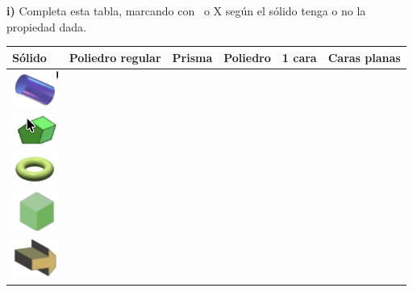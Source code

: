 \documentclass[12pt,a4paper]{article}
\begin{document}
\begin{tcolorbox}[enhanced, breakable,
	colback=fondoverde, colframe=verdeclaro, title=\textbf{PRACTICA}]
	\textbf{i)} Completa esta tabla, marcando con \checkmark\ o X según el sólido tenga o no la propiedad dada.
	
	{\centering
		\small
		\renewcommand{\arraystretch}{1.4}
		\begin{tabular}{|>{\centering\arraybackslash}m{3cm}|
				>{\centering\arraybackslash}m{2cm}|
				>{\centering\arraybackslash}m{2cm}|
				>{\centering\arraybackslash}m{2cm}|
				>{\centering\arraybackslash}m{2cm}|
				>{\centering\arraybackslash}m{2cm}|}
			\hline
			\textbf{Sólido} & \textbf{Poliedro regular} & \textbf{Prisma} & \textbf{Poliedro} & \textbf{1 cara} & \textbf{Caras planas} \\
			\hline
			\includegraphics[width=1.5cm]{Figuras/fig3.png} &  &  &  &  &  \\ %
			\hline
			\includegraphics[width=1.5cm]{Figuras/fig7.png} &  &  &  &  &  \\ %
			\hline
			\includegraphics[width=1.5cm]{Figuras/fig8.png} &  &  &  &  &  \\ %
			\hline
			\includegraphics[width=1.5cm]{Figuras/fig9.png} &  &  &  &  &  \\ %
			\hline
			\includegraphics[width=1.5cm]{Figuras/fig10.png} &  &  &  &  &  \\ %
			\hline
		\end{tabular}\par}
	
	\vspace{5mm}
	

\end{tcolorbox}
\end{document}
